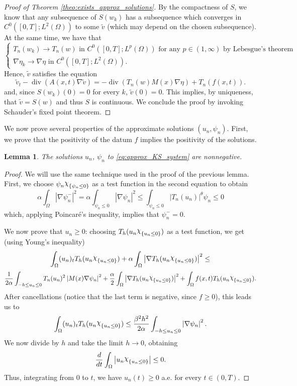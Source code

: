 \documentclass{amsart}
\numberwithin{equation}{section}
\newtheorem{lemma}[example]{Lemma}
\def\elleom#1{L^{#1}(\Omega)}
\def\io{\int_\Omega}
\newcommand{\abs}[1]{\left|#1\right|}
\DeclareRobustCommand{\rchi}{{\mathpalette\irchi\relax}}
\newcommand{\irchi}[2]{\raisebox{\depth}{$#1\chi$}} %
\begin{document}
\begin{proof}[Proof of Theorem \ref{theo:exists_approx_solutions}]
    By the compactness of $S$, we know that any subsequence of $S(w_k)$ has a subsequence which converges in $C^0([0,T];\elleom2)$ to some $\tilde v$ (which may depend on the chosen subsequence). At the same time, we have that
    \begin{equation}
        \left\{\begin{array}{cc}
          T_n(w_k)\to T_n(w)\text{ in } C^0([0,T];\elleom p) \text{ for any } p\in(1,\infty) \text{ by Lebesgue's theorem } \\
        \nabla\eta_k\to\nabla\eta\text{ in } C^0([0,T];\elleom 2).
        \end{array}\right.
    \end{equation}
    Hence, $\tilde v$ satisfies the equation
    $$
    \tilde v_t-\operatorname{div}(A(x, t) \nabla\tilde  v)=-\operatorname{div}(T_n(w) M(x) \nabla \eta)+T_n(f(x,t)).
    $$
    and, since $S(w_k)(0)=0$ for every $k$, $\tilde v(0)=0$.
    This implies, by uniqueness, that $\tilde v= S(w)$ and thus $S$ is continuous. We conclude the proof by invoking Schauder's fixed point theorem.
\end{proof}


We now prove several properties of the approximate solutions $(u_n,\psi_n)$. 
First, we prove that the positivity of the datum $f$ implies the positivity of the solutions.

\begin{lemma}
    The solutions $u_n$, $\psi_n$ to \eqref{eq:approx_KS_system} are nonnegative.
\end{lemma}
\begin{proof}
    We will use the same technique used in the proof of the previous lemma.
    First, we choose $\psi_n\rchi_{\{\psi_n\leq0\}}$ as a test function in the second equation to obtain
    $$
    \alpha\io\abs{\nabla\psi_n^-}^2=
    \alpha\int_{\psi_n\leq0}\abs{\nabla\psi_n}^2\leq 
    \int_{\psi_n\leq0}\abs{T_n(u_n)}^\theta\psi_n\leq0
    $$
    which, applying Poincaré's inequality, implies that $\psi_n^-=0$.

    We now prove that $u_n\geq0$: choosing $T_h(u_n\rchi_{\{u_n\leq0\}})$ as a test function, we get (using Young's inequality)
    $$
    \io (u_n)_tT_h(u_n\rchi_{\{u_n\leq0\}}) + \alpha \io \abs{\nabla T_h(u_n\rchi_{\{u_n\leq0\}})}^2
    \leq$$
    $$
    \frac{1}{2\alpha}\int_{-h\leq u_n\leq0} T_n(u_n)^2 \abs{M(x)\nabla\psi_n}^2 + \frac{\alpha}{2} \io \abs{\nabla T_h(u_n\rchi_{\{u_n\leq0\}})}^2 + \io f(x,t)T_h(u_n\rchi_{\{u_n\leq0\}}).
    $$
    After cancellations (notice that the last term is negative, since $f\geq0$), this leads us to
    $$
    \io (u_n)_tT_h(u_n\rchi_{\{u_n\leq0\}})
    \leq
    \frac{\beta^2 h^2}{2\alpha} \int_{-h\leq u_n\leq0} \abs{\nabla\psi_n}^2.
    $$
    We now divide by $h$ and take the limit $h\to0$, obtaining
    $$
    \frac{d}{dt}\io \abs{u_n\rchi_{\{u_n\leq0\}}}
    \leq
    0.
    $$
    Thus, integrating from $0$ to $t$, we have $u_n(t)\geq 0$ a.e. for every $t\in(0,T)$.
\end{proof}
\end{document}
